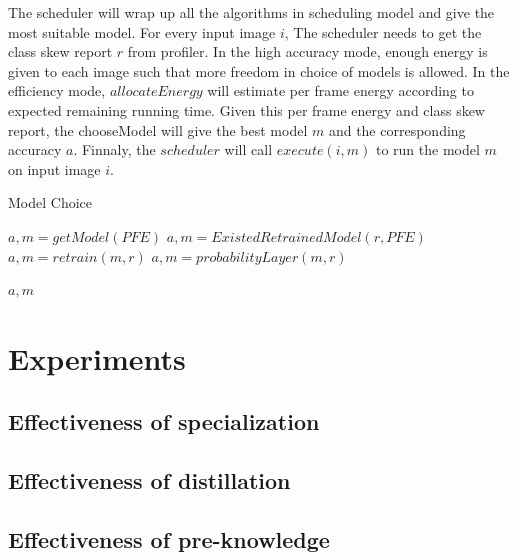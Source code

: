 \documentclass{article}
\begin{document}
The scheduler will wrap up all the algorithms in scheduling model and give the most suitable model. For every input image $i$, The scheduler needs to get the class skew report $r$ from profiler. In the high accuracy mode, enough energy is given to each image such that more freedom in choice of models is allowed. In the efficiency mode, $allocateEnergy$ will estimate per frame energy according to expected remaining running time. Given this per frame energy and class skew report, the chooseModel will give the best model $m$ and the corresponding accuracy $a$. Finnaly, the $scheduler$ will call $execute(i,m)$ to run the model $m$ on input image $i$.

\begin{algorithm}
 \caption{Model Choice}
  \begin{algorithmic}[2]
            \State $a, m = getModel(PFE)$   
            \State $a,m = ExistedRetrainedModel(r, PFE)$
                    \State $a,m = retrain(m,r)$
                \Else
                    \State $a,m = probabilityLayer(m,r)$
                \EndIf
            \EndIf
        \EndIf
        
        \State \Return $a,m$
    \EndFunction
    

\end{algorithmic}
\end{algorithm}




\section{Experiments}
\subsection{Effectiveness of specialization}

\subsection{Effectiveness of distillation}

\subsection{Effectiveness of pre-knowledge}
\end{document}

